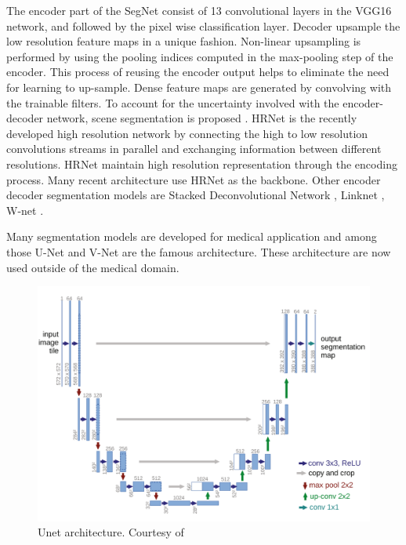     The encoder part of the SegNet consist of 13 convolutional layers in the VGG16 network, and followed by the pixel wise classification layer. Decoder upsample the low resolution feature maps in a unique fashion. Non-linear upsampling is performed by using the pooling indices computed in the max-pooling step of the encoder. This process of reusing the encoder output helps to eliminate the need for learning to up-sample. Dense feature maps are generated by convolving with the trainable filters. To account for the uncertainty involved with the encoder-decoder network, scene segmentation is proposed \cite{65_kendall2015bayesian}. HRNet \cite{66_sun2019high} is the recently developed high resolution network by connecting the high to low resolution convolutions streams in parallel	and exchanging information between different resolutions. HRNet maintain high resolution representation through the encoding process. Many recent architecture use HRNet as the backbone. Other encoder decoder segmentation models are Stacked Deconvolutional Network \cite{67_fu2019stacked}, Linknet \cite{68_hu2018learning}, W-net \cite{69_xia2017w}.
    
    Many segmentation models are developed for medical application and among those U-Net \cite{70_ronneberger2015u} and V-Net \cite{71_milletari2016v} are the famous architecture. These architecture are now used outside of the medical domain.
    
    \begin{figure}[h]
    	\centering
    	\includegraphics[width=14cm]{images/unet.png}
    	\caption{Unet architecture. Courtesy of \cite{70_ronneberger2015u}}
    	\label{fig:unet}
    \end{figure} 
	
